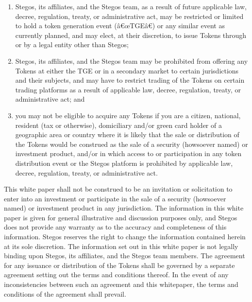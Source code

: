 \documentclass[8pt,fleqn,openany]{book}
\begin{document}
{\begin{enumerate}[label=(\alph*)]
			\item Stegos, its affiliates, and the Stegos team, as a result of future applicable law, decree, regulation, treaty, or administrative act, may be restricted or limited to hold a token generation event (â€œTGEâ€) or any similar event as currently planned, and may elect, at their discretion, to issue Tokens through or by a legal entity other than Stegos; 
			
			\item Stegos, its affiliates, and the Stegos team may be prohibited from offering any Tokens at either the TGE or in a secondary market to certain jurisdictions and their subjects, and may have to restrict trading of the Tokens on certain trading platforms as a result of applicable law, decree, regulation, treaty, or administrative act; and 
			
			\item you may not be eligible to acquire any Tokens if you are a citizen, national, resident (tax or otherwise), domiciliary and/or green card holder of a geographic area or country where it is likely that the sale or distribution of the Tokens would be construed as the sale of a security (howsoever named) or investment product, and/or in which access to or participation in any token distribution event or the Stegos platform is prohibited by applicable law, decree, regulation, treaty, or administrative act. 
			
		\end{enumerate}
		
		This white paper shall not be construed to be an invitation or solicitation to enter into an investment or participate in the sale of a security (howsoever named) or investment product in any jurisdiction. The information in this white paper is given for general illustrative and discussion purposes only, and Stegos does not provide any warranty as to the accuracy and completeness of this information. Stegos reserves the right to change the information contained herein at its sole discretion. The information set out in this white paper is not legally binding upon Stegos, its affiliates, and the Stegos team members. The agreement for any issuance or distribution of the Tokens shall be governed by a separate agreement setting out the terms and conditions thereof. In the event of any inconsistencies between such an agreement and this whitepaper, the terms and conditions of the agreement shall prevail. 
		
		\newpage \appendix
		\addappheadtotoc
		
}
\end{document}
